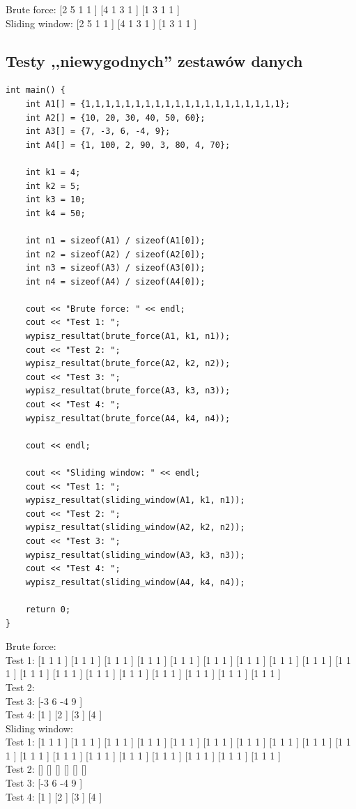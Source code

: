\documentclass{article}
\begin{document}
Brute force: [2 5 1 1 ] [4 1 3 1 ] [1 3 1 1 ] \\
Sliding window: [2 5 1 1 ] [4 1 3 1 ] [1 3 1 1 ]

\subsection{Testy ,,niewygodnych” zestawów danych}
\begin{lstlisting}
int main() {
    int A1[] = {1,1,1,1,1,1,1,1,1,1,1,1,1,1,1,1,1,1,1,1};
    int A2[] = {10, 20, 30, 40, 50, 60};
    int A3[] = {7, -3, 6, -4, 9};
    int A4[] = {1, 100, 2, 90, 3, 80, 4, 70};

    int k1 = 4;
    int k2 = 5;
    int k3 = 10;
    int k4 = 50;

    int n1 = sizeof(A1) / sizeof(A1[0]);
    int n2 = sizeof(A2) / sizeof(A2[0]);
    int n3 = sizeof(A3) / sizeof(A3[0]);
    int n4 = sizeof(A4) / sizeof(A4[0]);
    
    cout << "Brute force: " << endl;
    cout << "Test 1: ";
    wypisz_resultat(brute_force(A1, k1, n1));
    cout << "Test 2: ";
    wypisz_resultat(brute_force(A2, k2, n2));
    cout << "Test 3: ";
    wypisz_resultat(brute_force(A3, k3, n3));
    cout << "Test 4: ";
    wypisz_resultat(brute_force(A4, k4, n4));

    cout << endl;

    cout << "Sliding window: " << endl;
    cout << "Test 1: ";
    wypisz_resultat(sliding_window(A1, k1, n1));
    cout << "Test 2: ";
    wypisz_resultat(sliding_window(A2, k2, n2));
    cout << "Test 3: ";
    wypisz_resultat(sliding_window(A3, k3, n3));
    cout << "Test 4: ";
    wypisz_resultat(sliding_window(A4, k4, n4));

    return 0;
}
\end{lstlisting}
Brute force: \\
Test 1: [1 1 1 ] [1 1 1 ] [1 1 1 ] [1 1 1 ] [1 1 1 ] [1 1 1 ] [1 1 1 ] [1 1 1 ] [1 1 1 ] [1 1 1 ] [1 1 1 ] [1 1 1 ] [1 1 1 ] [1 1 1 ] [1 1 1 ] [1 1 1 ] [1 1 1 ] [1 1 1 ] \\
Test 2: \\
Test 3: [-3 6 -4 9 ] \\
Test 4: [1 ] [2 ] [3 ] [4 ] \\

Sliding window: \\
Test 1: [1 1 1 ] [1 1 1 ] [1 1 1 ] [1 1 1 ] [1 1 1 ] [1 1 1 ] [1 1 1 ] [1 1 1 ] [1 1 1 ] [1 1 1 ] [1 1 1 ] [1 1 1 ] [1 1 1 ] [1 1 1 ] [1 1 1 ] [1 1 1 ] [1 1 1 ] [1 1 1 ] \\
Test 2: [] [] [] [] [] [] \\
Test 3: [-3 6 -4 9 ] \\
Test 4: [1 ] [2 ] [3 ] [4 ] \\
\end{document}
